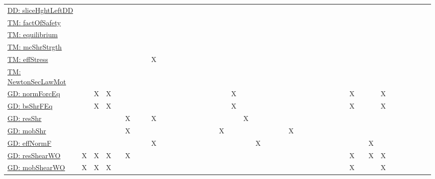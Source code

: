 \documentclass[12pt]{article}
\begin{document}
\begin{longtable}{l l l l l l l l l l l l l l l l l l l l l l l l l l l l l l l l l l l l l l l l l l}
\\
\hyperref[DD:sliceHghtLeftDD]{DD: sliceHghtLeftDD} &  &  &  &  &  &  &  &  &  &  &  &  &  &  &  &  &  &  &  &  &  &  &  &  &  &  &  &  &  &  &  &  &  &  &  &  &  &  &  &  & 
\\
\hyperref[TM:factOfSafety]{TM: factOfSafety} &  &  &  &  &  &  &  &  &  &  &  &  &  &  &  &  &  &  &  &  &  &  &  &  &  &  &  &  &  &  &  &  &  &  &  &  &  &  &  &  & 
\\
\hyperref[TM:equilibrium]{TM: equilibrium} &  &  &  &  &  &  &  &  &  &  &  &  &  &  &  &  &  &  &  &  &  &  &  &  &  &  &  &  &  &  &  &  &  &  &  &  &  &  &  &  & 
\\
\hyperref[TM:mcShrStrgth]{TM: mcShrStrgth} &  &  &  &  &  &  &  &  &  &  &  &  &  &  &  &  &  &  &  &  &  &  &  &  &  &  &  &  &  &  &  &  &  &  &  &  &  &  &  &  & 
\\
\hyperref[TM:effStress]{TM: effStress} &  &  &  &  &  &  &  & X &  &  &  &  &  &  &  &  &  &  &  &  &  &  &  &  &  &  &  &  &  &  &  &  &  &  &  &  &  &  &  &  & 
\\
\hyperref[TM:NewtonSecLawMot]{TM: NewtonSecLawMot} &  &  &  &  &  &  &  &  &  &  &  &  &  &  &  &  &  &  &  &  &  &  &  &  &  &  &  &  &  &  &  &  &  &  &  &  &  &  &  &  & 
\\
\hyperref[GD:normForcEq]{GD: normForcEq} &  & X & X &  &  &  &  &  &  &  &  &  &  &  &  &  &  & X &  &  &  &  &  &  &  &  &  &  &  &  &  & X &  &  & X &  &  &  &  &  & 
\\
\hyperref[GD:bsShrFEq]{GD: bsShrFEq} &  & X & X &  &  &  &  &  &  &  &  &  &  &  &  &  &  & X &  &  &  &  &  &  &  &  &  &  &  &  &  & X &  &  & X &  &  &  &  &  & 
\\
\hyperref[GD:resShr]{GD: resShr} &  &  &  &  & X &  &  & X &  &  &  &  &  &  &  &  &  &  & X &  &  &  &  &  &  &  &  &  &  &  &  &  &  &  &  &  &  &  &  &  & 
\\
\hyperref[GD:mobShr]{GD: mobShr} &  &  &  &  & X &  &  &  &  &  &  &  &  &  &  &  & X &  &  &  &  &  &  & X &  &  &  &  &  &  &  &  &  &  &  &  &  &  &  &  & 
\\
\hyperref[GD:effNormF]{GD: effNormF} &  &  &  &  &  &  &  & X &  &  &  &  &  &  &  &  &  &  &  & X &  &  &  &  &  &  &  &  &  &  &  &  &  & X &  &  &  &  &  &  & 
\\
\hyperref[GD:resShearWO]{GD: resShearWO} & X & X & X &  & X &  &  &  &  &  &  &  &  &  &  &  &  &  &  &  &  &  &  &  &  &  &  &  &  &  &  & X &  & X & X &  &  &  &  &  & 
\\
\hyperref[GD:mobShearWO]{GD: mobShearWO} & X & X & X &  &  &  &  &  &  &  &  &  &  &  &  &  &  &  &  &  &  &  &  &  &  &  &  &  &  &  &  & X &  &  & X &  &  &  &  &  & 

\end{longtable}
\end{document}
